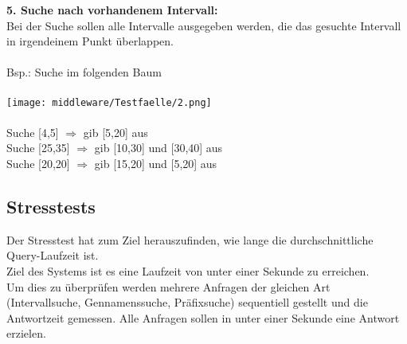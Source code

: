 \textbf{5. Suche nach vorhandenem Intervall:}\\
Bei der Suche sollen alle Intervalle ausgegeben werden, die das gesuchte Intervall in irgendeinem Punkt überlappen.\\\\
Bsp.: Suche im folgenden Baum\\\\
\texttt{[image: middleware/Testfaelle/2.png]}\\\\Suche [4,5] $\Rightarrow$ gib [5,20] aus\\
Suche [25,35] $\Rightarrow$ gib [10,30] und [30,40] aus\\
Suche [20,20] $\Rightarrow$ gib [15,20] und [5,20] aus
\subsection{Stresstests}
Der Stresstest hat zum Ziel herauszufinden, wie lange die durchschnittliche Query-Laufzeit ist.\\
Ziel des Systems ist es eine Laufzeit von unter einer Sekunde zu erreichen.\\
Um dies zu überprüfen werden mehrere Anfragen der gleichen Art (Intervallsuche, Gennamenssuche, Präfixsuche) sequentiell gestellt und die Antwortzeit gemessen. Alle Anfragen sollen in unter einer Sekunde eine Antwort erzielen.

